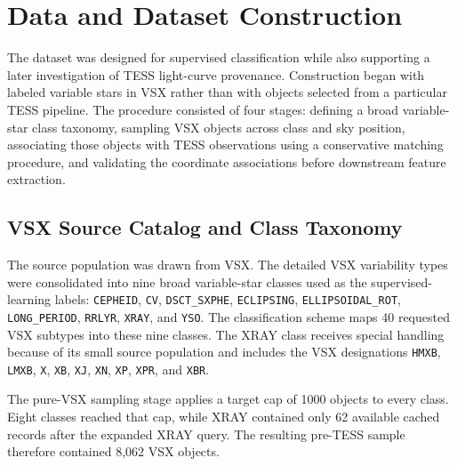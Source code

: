 \documentclass[linenumbers]{aastex701}
\begin{document}
\section{Data and Dataset Construction}
\label{sec:dataset}

The dataset was designed for supervised classification while also supporting a later investigation of TESS light-curve provenance. Construction began with labeled variable stars in VSX rather than with objects selected from a particular TESS pipeline. The procedure consisted of four stages: defining a broad variable-star class taxonomy, sampling VSX objects across class and sky position, associating those objects with TESS observations using a conservative matching procedure, and validating the coordinate associations before downstream feature extraction.

\subsection{VSX Source Catalog and Class Taxonomy}
\label{subsec:vsx_taxonomy}

The source population was drawn from VSX. The detailed VSX variability types were consolidated into nine broad variable-star classes used as the supervised-learning labels: \texttt{CEPHEID}, \texttt{CV}, \texttt{DSCT\_SXPHE}, \texttt{ECLIPSING}, \texttt{ELLIPSOIDAL\_ROT}, \texttt{LONG\_PERIOD}, \texttt{RRLYR}, \texttt{XRAY}, and \texttt{YSO}. The classification scheme maps 40 requested VSX subtypes into these nine classes. The XRAY class receives special handling because of its small source population and includes the VSX designations \texttt{HMXB}, \texttt{LMXB}, \texttt{X}, \texttt{XB}, \texttt{XJ}, \texttt{XN}, \texttt{XP}, \texttt{XPR}, and \texttt{XBR}.

The pure-VSX sampling stage applies a target cap of 1000 objects to every class. Eight classes reached that cap, while XRAY contained only 62 available cached records after the expanded XRAY query. The resulting pre-TESS sample therefore contained 8,062 VSX objects.
\end{document}
